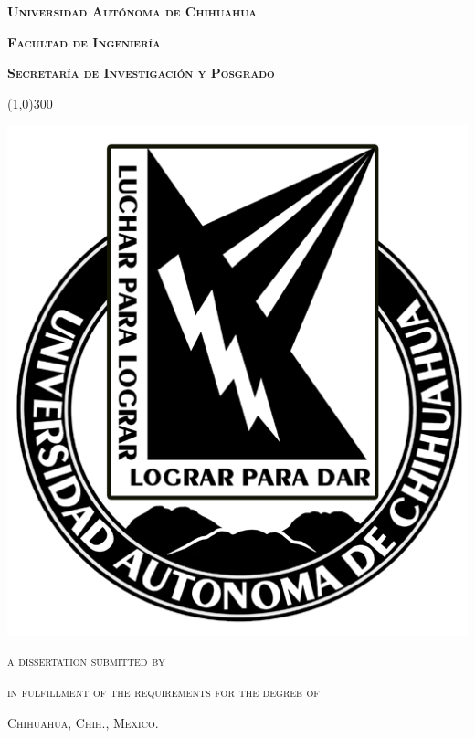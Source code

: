 
\thispagestyle{empty}

\begin{center}

    \LARGE{ \textbf{ \textsc{
        Universidad Autónoma de Chihuahua
    } } }    
    
    \vspace*{3mm}
    \Large{ \textbf{ \textsc{
        Facultad de Ingeniería
    } } }    
    
    \vspace*{4mm}
    \large{ \textbf{ \textsc{
        Secretaría de Investigación y Posgrado
    } } }  
    
    \vspace*{5mm}
    \line(1,0){300}
    
    \vspace*{1.5cm}
    \includegraphics{template/uach.png}
    
    \vspace*{1cm}
    \huge{ \textbf{ \textsc{
        \vTitle
    } } }    
    
    \vspace*{1cm}
    \normalsize{ 
        \textsc{
            a dissertation submitted by
        } 
    }  
    
    \vspace*{5mm}
    \LARGE{ \textbf{ \textsc{
        \vAuthor
    } } }   
    
    \vspace*{7mm}
    \normalsize{
        \textsc{
            in fulfillment of the requirements for the degree of 
        } 
    }
    
    \vspace*{5mm}
    \Large{ \textbf{ \textsc{
        \vDegree
    } } }   
    
\end{center}

\vspace*{4cm}
\normalsize{ 
    \textsc{
        Chihuahua, Chih., Mexico.
        \hspace*{6cm}
        \vDate
    }
}

\restoregeometry    

